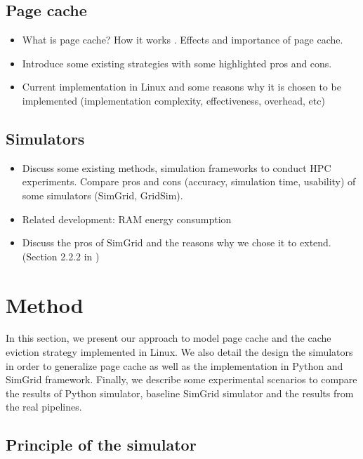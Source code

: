 \documentclass[conference]{IEEEtran}
\begin{document}
		\subsection{Page cache}
			\begin{itemize}
				\item What is page cache? How it works \cite{linuxdev3rd2010}. Effects and importance of page cache.
				\item Introduce some existing strategies with some highlighted pros and cons.
				\item Current implementation in Linux and some reasons why it is chosen to be implemented (implementation complexity, effectiveness, overhead, etc) \cite{linuxdev3rd2010}
			\end{itemize}									

		\subsection{Simulators}
			\begin{itemize}
				\item Discuss some existing methods, simulation frameworks to conduct HPC experiments. Compare pros and cons (accuracy, simulation time, usability) of some simulators (SimGrid, GridSim).
				\item Related development: RAM energy consumption \cite{gill2019} \cite{ouarnoughi2017} 
				\item Discuss the pros of SimGrid and the reasons why we chose it to extend. (Section 2.2.2 in \cite{casanova2014})
			\end{itemize}
			
	\section{Method}
		In this section, we present our approach to model page cache and
		the cache eviction strategy implemented in Linux. We also detail
		the design the simulators in order to generalize page cache as well
		as the implementation in Python and SimGrid framework. Finally, we
		describe some experimental scenarios to compare the results of
		Python simulator, baseline SimGrid simulator and the results from
		the real pipelines. 

		\subsection{Principle of the simulator}
	
\end{document}

